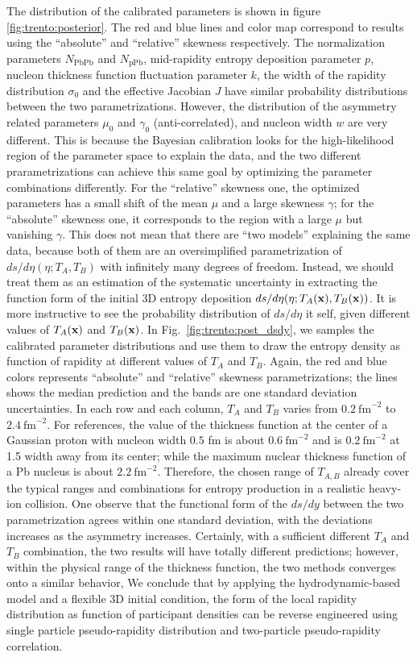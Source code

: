 The distribution of the calibrated parameters is shown in figure \ref{fig:trento:posterior}.
The red and blue lines and color map correspond to results using the ``absolute'' and ``relative'' skewness respectively.
The normalization parameters $N_{\textrm{PbPb}}$ and $N_{\textrm{pPb}}$, mid-rapidity entropy deposition parameter $p$, nucleon thickness function fluctuation parameter $k$, the width of the rapidity distribution $\sigma_0$ and the effective Jacobian $J$ have similar probability distributions between the two parametrizations.
However, the distribution of the asymmetry related parameters $\mu_0$ and $\gamma_0$ (anti-correlated), and nucleon width $w$ are very different.
This is because the Bayesian calibration looks for the high-likelihood region of the parameter space to explain the data, and the two different prarametrizations can achieve this same goal by optimizing the parameter combinations differently.
For the ``relative'' skewness one, the optimized parameters has a small shift of the mean $\mu$ and a large skewness $\gamma$; for the ``absolute'' skewness one, it corresponds to the region with a large $\mu$ but vanishing $\gamma$.
This does not mean that there are ``two models'' explaining the same data, because both of them are an oversimplified parametrization of $ds/d\eta(\eta; T_A, T_B)$ with infinitely many degrees of freedom. 
Instead, we should treat them as an estimation of the systematic uncertainty in extracting the function form of the initial 3D entropy deposition $ds/d\eta(\eta; T_A(\mathbf x), T_B(\mathbf x))$.
It is more instructive to see the probability distribution of $ds/d\eta$ it self, given different values of $T_A(\mathbf x)$ and $T_B(\mathbf x)$.
In Fig.~\ref{fig:trento:post_dsdy}, we samples the calibrated parameter distributions and use them to draw the entropy density as function of rapidity at different values of $T_A$ and $T_B$. 
Again, the red and blue colors represents ``absolute'' and ``relative'' skewness parametrizations; the lines shows the median prediction and the bands are one standard deviation uncertainties. 
In each row and each column, $T_A$ and $T_B$ varies from $0.2~\text{fm}^{-2}$ to $2.4~\text{fm}^{-2}$. 
For references, the value of the thickness function at the center of a Gaussian proton with nucleon width $0.5$ fm is about $0.6~\text{fm}^{-2}$ and is $0.2~\text{fm}^{-2}$  at 1.5 width away from its center; while the maximum nuclear thickness function of a Pb nucleus is about $2.2~\text{fm}^{-2}$.
Therefore, the chosen range of $T_{A,B}$ already cover the typical ranges and combinations for entropy production in a realistic heavy-ion collision.
One observe that the functional form of the $ds/dy$ between the two parametrization agrees within one standard deviation, with the deviations increases as the asymmetry increases.
Certainly, with a sufficient different $T_A$ and $T_B$ combination, the two results will have totally different predictions; however, within the physical range of the thickness function, the two methods converges onto a similar behavior,
We conclude that by applying the hydrodynamic-based model and a flexible 3D initial condition, the form of the local rapidity distribution as function of participant densities can be reverse engineered using single particle pseudo-rapidity distribution and two-particle pseudo-rapidity correlation.

